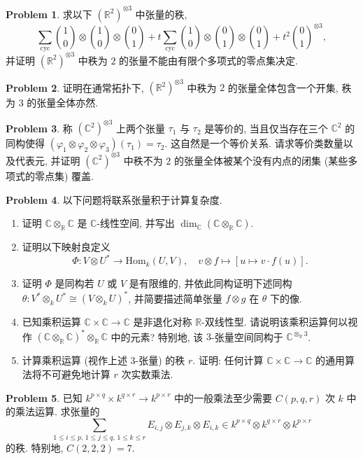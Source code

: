 \documentclass{MainStyle}
\theoremstyle{definition}
\newtheorem{problem}{Problem}
\begin{document}
\begin{problem}
求以下 $(\mathbb R^2)^{\otimes 3}$ 中张量的秩,
\begin{equation}
    \sum_{\text{cyc}}\binom10\otimes \binom10\otimes \binom01+t\sum_{\text{cyc}}\binom10\otimes \binom01\otimes \binom01+t^2\binom01^{\otimes 3},
\end{equation}
并证明 $(\mathbb R^2)^{\otimes 3}$ 中秩为 $2$ 的张量不能由有限个多项式的零点集决定.
\end{problem}

\begin{problem}
证明在通常拓扑下, $(\mathbb R^2)^{\otimes 3}$ 中秩为 $2$ 的张量全体包含一个开集, 秩为 $3$ 的张量全体亦然.
\end{problem}

\begin{problem}
称 $(\mathbb C^2)^{\otimes 3}$ 上两个张量 $\tau_1$ 与 $\tau_2$ 是等价的, 当且仅当存在三个 $\mathbb C^2$ 的同构使得 $(\varphi_1\otimes \varphi_2\otimes \varphi_3)(\tau_1)=\tau_2$. 这自然是一个等价关系. 请求等价类数量以及代表元, 并证明 $(\mathbb C^2)^{\otimes 3}$ 中秩不为 $2$ 的张量全体被某个没有内点的闭集 (某些多项式的零点集) 覆盖.
\end{problem}

\begin{problem}
以下问题将联系张量积于计算复杂度.
\begin{enumerate}
    \item 证明 $\mathbb C\otimes _{\mathbb R}\mathbb C$ 是 $\mathbb C$-线性空间, 并写出 $\dim_{\mathbb C}(\mathbb C\otimes _{\mathbb R}\mathbb C)$.
    \item 证明以下映射良定义
          \begin{equation}
              \Phi: V\otimes U^\ast\to \mathrm{Hom}_k(U,V),\quad v\otimes f\mapsto [u\mapsto v\cdot f(u)].
          \end{equation}
    \item 证明 $\Phi$ 是同构若 $U$ 或 $V$ 是有限维的, 并依此同构证明下述同构 $\theta: V^\ast \otimes_k U^\ast \cong (V\otimes_k U)^\ast$, 并简要描述简单张量 $f\otimes g$ 在 $\theta$ 下的像.
    \item 已知乘积运算 $\mathbb C\times \mathbb C\to \mathbb C$ 是非退化对称 $\mathbb R$-双线性型. 请说明该乘积运算何以视作 $(\mathbb C\otimes _{\mathbb R}\mathbb C)^\ast\otimes _{\mathbb R}\mathbb C$ 中的元素? 特别地, 该 $3$-张量空间同构于 $\mathbb C^{\otimes_{\mathbb R} 3}$.
    \item 计算乘积运算 (视作上述 $3$-张量) 的秩 $r$. 证明: 任何计算 $\mathbb C\times \mathbb C\to \mathbb C$ 的通用算法将不可避免地计算 $r$ 次实数乘法.
\end{enumerate}
\end{problem}

\begin{problem}
已知 $k^{p\times q}\times k^{q\times r}\to k^{p\times r}$ 中的一般乘法至少需要 $C(p,q,r)$ 次 $k$ 中的乘法运算. 求张量的
\begin{equation}
    \sum_{1\leq i\leq p,\,1\leq j\leq q,\,1\leq k\leq r}E_{i,j}\otimes E_{j,k}\otimes E_{i,k}\in k^{p\times q}\otimes k^{q\times r}\otimes k^{p\times r}
\end{equation}
的秩. 特别地, $C(2,2,2)=7$.
\end{problem}
\end{document}
